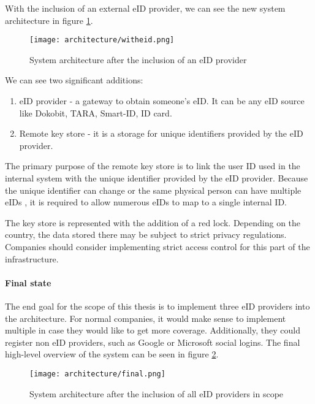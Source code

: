 With the inclusion of an external eID provider, we can see the new system architecture in figure \ref{fig:sys-highlevel-witheid}.

\begin{figure}
  \centering
  \texttt{[image: architecture/witheid.png]}
  \caption{System architecture after the inclusion of an eID provider}
  \label{fig:sys-highlevel-witheid}
\end{figure}

We can see two significant additions:

\begin{enumerate}
  \item eID provider - a gateway to obtain someone's eID. It can be any eID source like Dokobit, TARA, Smart-ID, ID card.
  \item Remote key store - it is a storage for unique identifiers provided by the eID provider.
\end{enumerate}

The primary purpose of the remote key store is to link the user ID used in the internal system with the unique identifier provided by the eID provider. Because the unique identifier can change or the same physical person can have multiple eIDs \cite{eidas-saml}, it is required to allow numerous eIDs to map to a single internal ID.

The key store is represented with the addition of a red lock. Depending on the country, the data stored there may be subject to strict privacy regulations. Companies should consider implementing strict access control for this part of the infrastructure.

\paragraph{Final state}

The end goal for the scope of this thesis is to implement three eID providers into the architecture. For normal companies, it would make sense to implement multiple in case they would like to get more coverage. Additionally, they could register non eID providers, such as Google or Microsoft social logins. The final high-level overview of the system can be seen in figure \ref{fig:sys-highlevel-final}.

\begin{figure}
  \centering
  \texttt{[image: architecture/final.png]}
  \caption{System architecture after the inclusion of all eID providers in scope}
  \label{fig:sys-highlevel-final}
\end{figure}

